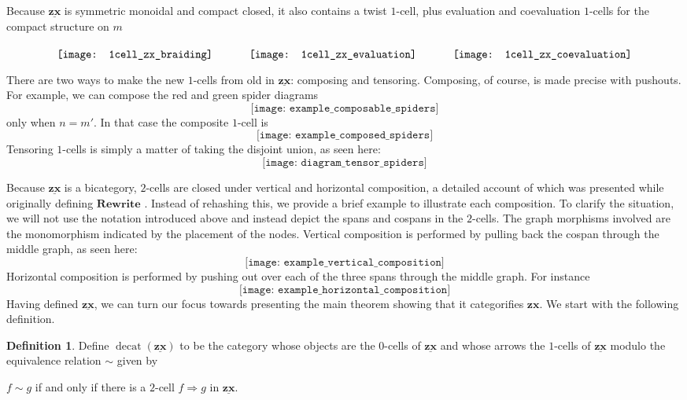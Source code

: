 \documentclass[11pt]{amsart}
\newcommand{\cat}[1]{\mathbf{#1}}
\theoremstyle{remark}
\theoremstyle{definition}
\newtheorem{defn}[thm]{Definition}
\newcommand{\bicat}[1]{\underline{\mathbf{#1}}}
\begin{document}
Because $\bicat{zx}$ is symmetric monoidal and compact closed, it also contains a twist $1$-cell, plus evaluation and coevaluation $1$-cells for the compact structure on $m$ 
\begin{equation}
\label{diag:TwistCompact 1cells}
\raisebox{-1\height}{
	\texttt{[image: 1cell\_zx\_braiding]}
	\quad \quad \quad
	\texttt{[image: 1cell\_zx\_evaluation]}
	\quad \quad \quad
	\texttt{[image: 1cell\_zx\_coevaluation]}
}
\end{equation}

There are two ways to make the new $1$-cells from old in $\bicat{zx}$: composing and tensoring.  Composing, of course, is made precise with pushouts. For example, we can compose the red and green spider diagrams
\[
\texttt{[image: example\_composable\_spiders]}
\]
only when $n=m'$.  In that case the composite $1$-cell is 
\[
	\texttt{[image: example\_composed\_spiders]}
\]
Tensoring $1$-cells is simply a matter of taking the disjoint union, as seen here: 
\[
	\texttt{[image: diagram\_tensor\_spiders]}
\]

Because $\bicat{zx}$ is a bicategory, $2$-cells are closed under vertical and horizontal composition, a detailed account of which was presented while originally defining $\cat{Rewrite}$ \cite{Cic}.  Instead of rehashing this, we provide a brief example to illustrate each composition. To clarify the situation, we will not use the notation introduced above and instead depict the spans and cospans in the $2$-cells. The graph morphisms involved are the monomorphism indicated by the placement of the nodes.  Vertical composition is performed by pulling back the cospan through the middle graph, as seen here:
\[
	\texttt{[image: example\_vertical\_composition]}
\]
Horizontal composition is performed by pushing out over each of the three spans through the middle graph. For instance
\[
	\texttt{[image: example\_horizontal\_composition]}
\]
Having defined $\bicat{zx}$, we can turn our focus towards presenting the main theorem showing that it categorifies $\cat{zx}$. We start with the following definition.

\begin{defn}
	Define $\operatorname{decat}(\bicat{zx})$ to be the category whose objects are the $0$-cells of $\bicat{zx}$ and whose arrows the $1$-cells of $\bicat{zx}$ modulo the equivalence relation $\sim$ given by 
	\begin{center}
		$f \sim g$ if and only if there is a $2$-cell $f \Rightarrow g$ in $\bicat{zx}$.
	\end{center}
\end{defn}
\end{document}
